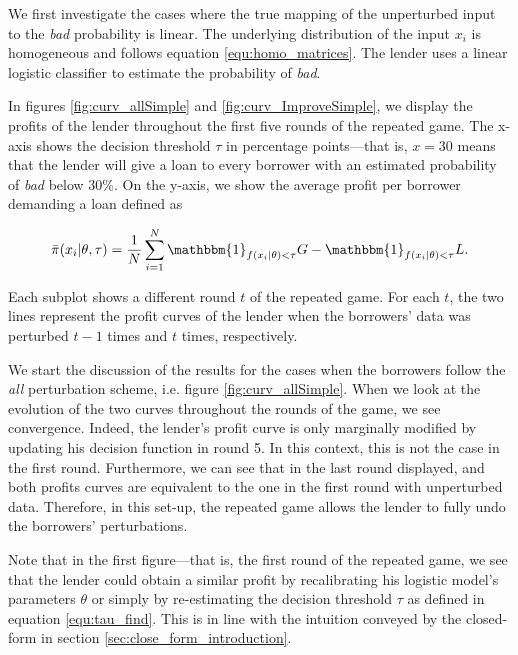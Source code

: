 \documentclass[12pt]{article} %
\begin{document}
We first investigate the cases where the true mapping of the unperturbed input to the \textit{bad} probability is linear. The underlying distribution of the input $x_i$ is homogeneous and follows equation \eqref{equ:homo_matrices}. The lender uses a linear logistic classifier to estimate the probability of \textit{bad}.

In figures \ref{fig:curv_allSimple} and \ref{fig:curv_ImproveSimple}, we display the profits of the lender throughout the first five rounds of the repeated game. The x-axis shows the decision threshold $\tau$ in percentage points---that is, $x=30$ means that the lender will give a loan to every borrower with an estimated probability of \textit{bad} below $30\%$. On the y-axis, we show the average profit per borrower demanding a loan defined as

\begin{equation}\label{equ:pi_bar} 
\bar{\pi}(x_i|\theta, \tau) =  \frac{1}{N} \sum_{i=1}^N 
\mathbbm{1}_{f(x_i | \theta)<\tau} G -  \mathbbm{1}_{f(x_i | \theta)<\tau} L.
\end{equation} 

Each subplot shows a different round $t$ of the repeated game. For each $t$, the two lines represent the profit curves of the lender when the borrowers' data was perturbed $t-1$ times and $t$ times, respectively. 

We start the discussion of the results for the cases when the borrowers follow the \textit{all} perturbation scheme, i.e. figure \ref{fig:curv_allSimple}. 
When we look at the evolution of the two curves throughout the rounds of the game, we see convergence. Indeed, the lender's profit curve is only marginally modified by updating his decision function in round 5. In this context, this is not the case in the first round. Furthermore, we can see that in the last round displayed, and both profits curves are equivalent to the one in the first round with unperturbed data. Therefore, in this set-up, the repeated game allows the lender to fully undo the borrowers' perturbations. 

Note that in the first figure---that is, the first round of the repeated game, we see that the lender could obtain a similar profit by recalibrating his logistic model's parameters $\theta$ or simply by re-estimating the decision threshold $\tau$ as defined in equation \eqref{equ:tau_find}. This is in line with the intuition conveyed by the closed-form in section \ref{sec:close_form_introduction}. 
\end{document}
